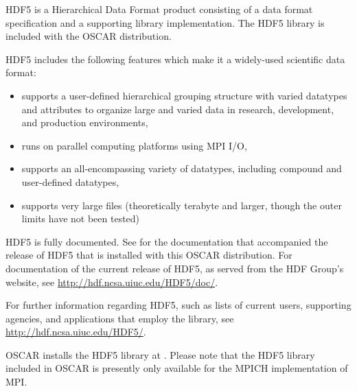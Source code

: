 %
%
%

HDF5 is a Hierarchical Data Format product consisting of a data format
specification and a supporting library implementation. The HDF5
library is included with the OSCAR distribution.

HDF5 includes the following features which make it a widely-used
scientific data format:

\begin{itemize}
\item supports a user-defined hierarchical grouping structure with
  varied datatypes and attributes to organize large and varied data in
  research, development, and production environments,
\item runs on parallel computing platforms using MPI I/O,
\item supports an all-encompassing variety of datatypes, including
  compound and user-defined datatypes,
\item supports very large files (theoretically terabyte and larger,
  though the outer limits have not been tested)
\end{itemize}

HDF5 is fully documented.  See
 for the
documentation that accompanied the release of HDF5 that is installed
with this OSCAR distribution.  For documentation of the current
release of HDF5, as served from the HDF Group's website, see
\url{http://hdf.ncsa.uiuc.edu/HDF5/doc/}.

For further information regarding HDF5, such as lists of current
users, supporting agencies, and applications that employ the library,
see \url{http://hdf.ncsa.uiuc.edu/HDF5/}.

OSCAR installs the HDF5 library at
.  Please note that the HDF5
library included in OSCAR is presently only available for the MPICH
implementation of MPI.


